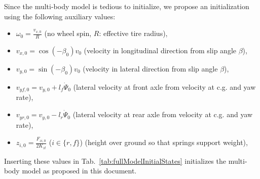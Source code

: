 \documentclass[11pt,a4paper]{article}
\renewcommand{\^}[1]{^{(#1)}}
\begin{document}
Since the multi-body model is tedious to initialize, we propose an initialization using the following auxiliary values: 
\begin{itemize}
 \item $\omega_0 = \frac{v_{x,0}}{R}$ (no wheel spin, $R$: effective tire radius), 
 \item $v_{x,0} = \cos(-\beta_0) v_0$ (velocity in longitudinal direction from slip angle $\beta$),
 \item $v_{y,0} = \sin(-\beta_0) v_0$ (velocity in lateral direction from slip angle $\beta$),
 \item $v_{yf,0} = v_{y,0} + l_f \dot{\Psi}_0$ (lateral velocity at front axle from velocity at c.g. and yaw rate),
 \item $v_{yr,0} = v_{y,0} - l_r \dot{\Psi}_0$ (lateral velocity at rear axle from velocity at c.g. and yaw rate),
 \item $z_{i,0} = \frac{F_{zi,0}}{2K_{zt}}$ ($i\in\{r,f\}$) (height over ground so that springs support weight),
\end{itemize}
Inserting these values in Tab.~\ref{tab:fullModelInitialStates} initializes the multi-body model as proposed in this document.
\end{document}
